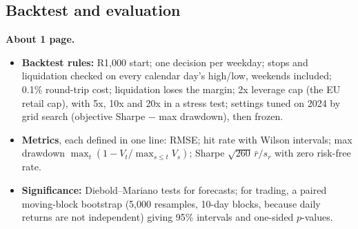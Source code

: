 \subsection{Backtest and evaluation}\label{sec:evaluation}
\begin{guide}
\textbf{About 1 page.}
\begin{itemize}
  \item \textbf{Backtest rules:} R1{,}000 start; one decision per weekday; stops and liquidation checked on every calendar day's high/low, weekends included; 0.1\% round-trip cost; liquidation loses the margin; 2x leverage cap (the EU retail cap), with 5x, 10x and 20x in a stress test; settings tuned on 2024 by grid search (objective Sharpe $-$ max drawdown), then frozen.
  \item \textbf{Metrics}, each defined in one line: RMSE; hit rate with Wilson intervals; max drawdown $\max_t(1 - V_t/\max_{s\le t}V_s)$; Sharpe $\sqrt{260}\,\bar r/s_r$ with zero risk-free rate.
  \item \textbf{Significance:} Diebold--Mariano tests for forecasts; for trading, a paired moving-block bootstrap (5{,}000 resamples, 10-day blocks, because daily returns are not independent) giving 95\% intervals and one-sided $p$-values.
\end{itemize}
\end{guide}
\tbc{}
